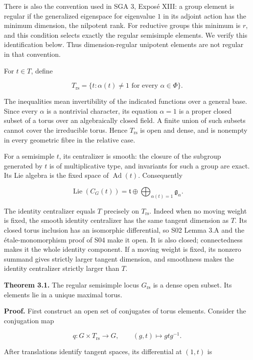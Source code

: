 \documentclass[11pt,a4paper,openany]{report}
\newcounter{none}
\begin{document}
There is also the convention used in SGA 3, Exposé XIII: a group element is regular if the generalized eigenspace for eigenvalue \(1\) in its adjoint action has the minimum dimension, the nilpotent rank. For reductive groups this minimum is \(r\), and this condition selects exactly the regular semisimple elements. We verify this identification below. Thus dimension-regular unipotent elements are not regular in that convention.

For \(t\in T\), define

\[
T_{\mathrm{rs}}=\{t:\alpha(t)\ne1\text{ for every }\alpha\in\Phi\}.
\]

The inequalities mean invertibility of the indicated functions over a general base. Since every \(\alpha\) is a nontrivial character, its equation \(\alpha=1\) is a proper closed subset of a torus over an algebraically closed field. A finite union of such subsets cannot cover the irreducible torus. Hence \(T_{\mathrm{rs}}\) is open and dense, and is nonempty in every geometric fibre in the relative case.

For a semisimple \(t\), its centralizer is smooth: the closure of the subgroup generated by \(t\) is of multiplicative type, and invariants for such a group are exact. Its Lie algebra is the fixed space of \(\operatorname{Ad}(t)\). Consequently

\[
\operatorname{Lie}(C_G(t))=\mathfrak t\oplus
\bigoplus_{\alpha(t)=1}\mathfrak g_\alpha.
\]

The identity centralizer equals \(T\) precisely on \(T_{\mathrm{rs}}\). Indeed when no moving weight is fixed, the smooth identity centralizer has the same tangent dimension as \(T\). Its closed torus inclusion has an isomorphic differential, so S02 Lemma 3.A and the étale-monomorphism proof of S04 make it open. It is also closed; connectedness makes it the whole identity component. If a moving weight is fixed, its nonzero summand gives strictly larger tangent dimension, and smoothness makes the identity centralizer strictly larger than \(T\).

\textbf{Theorem 3.1.} The regular semisimple locus \(G_{\mathrm{rs}}\) is a dense open subset. Its elements lie in a unique maximal torus.

\textbf{Proof.} First construct an open set of conjugates of torus elements. Consider the conjugation map

\[
q:G\times T_{\mathrm{rs}}\longrightarrow G,\qquad(g,t)\longmapsto gtg^{-1}.
\]

After translations identify tangent spaces, its differential at \((1,t)\) is
\end{document}
